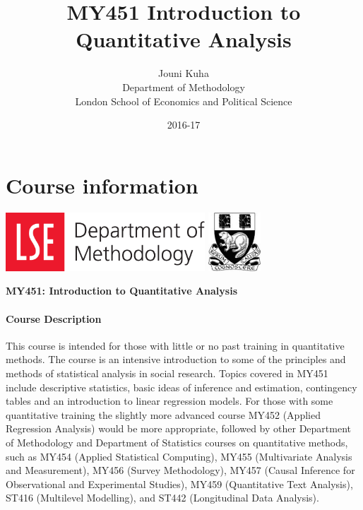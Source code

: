 \documentclass[11pt,a4paper,openany]{book}
\title{MY451 Introduction to Quantitative Analysis}
\author{Jouni Kuha \\ Department of Methodology \\ London School of Economics and Political Science}
\date{2016-17}
\begin{document}
\maketitle

{
\setcounter{tocdepth}{1}
\tableofcontents
}
\frontmatter\thispagestyle{empty}

\chapter*{Course information}\label{course-information}

\includegraphics[height=2.20000cm]{dept_of_methodology.pdf}
\hfill\includegraphics[height=2.20000cm]{lse.pdf}

\newpage

\thispagestyle{empty}

\newpage

\setcounter{page}{1}

\textbf{MY451: Introduction to Quantitative Analysis}

\subsubsection*{Course Description}\label{course-description}

This course is intended for those with little or no past training in
quantitative methods. The course is an intensive introduction to some of
the principles and methods of statistical analysis in social research.
Topics covered in MY451 include descriptive statistics, basic ideas of
inference and estimation, contingency tables and an introduction to
linear regression models. For those with some quantitative training the
slightly more advanced course MY452 (Applied Regression Analysis) would
be more appropriate, followed by other Department of Methodology and
Department of Statistics courses on quantitative methods, such as MY454
(Applied Statistical Computing), MY455 (Multivariate Analysis and
Measurement), MY456 (Survey Methodology), MY457 (Causal Inference for
Observational and Experimental Studies), MY459 (Quantitative Text
Analysis), ST416 (Multilevel Modelling), and ST442 (Longitudinal Data
Analysis).
\end{document}
